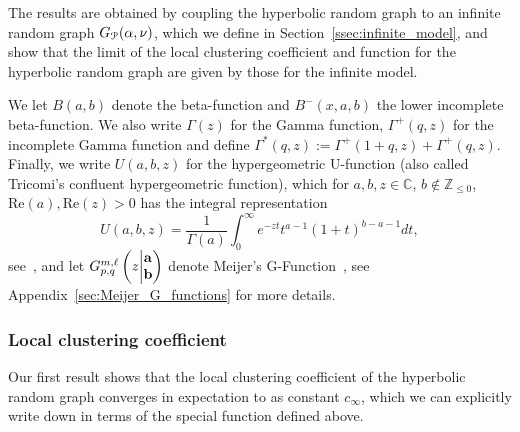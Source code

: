 The results are obtained by coupling the hyperbolic random graph to an infinite random graph $G_\Pcal(\alpha,\nu)$, which we define in Section~\ref{ssec:infinite_model}, and show that the limit of the local clustering coefficient and function for the hyperbolic random graph are given by those for the infinite model. 

We let $B(a,b)$ denote the beta-function and $B^-(x,a,b)$ the lower incomplete beta-function. We also write $\Gamma(z)$ for the Gamma function, $\Gamma^+(q,z)$ for the incomplete Gamma function and define $\Gamma^\ast(q,z) := \Gamma^+(1 + q, z) + \Gamma^+(q, z)$. Finally, we write $U(a,b,z)$ for the hypergeometric U-function (also called Tricomi's confluent hypergeometric function), which for $a,b,z\in \mathbb{C}$, $b \not \in \mathbb{Z}_{\leq 0}$, $\mathrm{Re}(a), \mathrm{Re}(z) >0$ has the integral representation 
\[
	U(a,b,z) = \frac{1}{\Gamma(a)} \int_0^\infty e^{-zt} t^{a-1} (1+t)^{b-a-1} dt,
\] 
see~\cite[p.255 Equation (2)]{erdelyi1953higher}, and let $\MeijerGnew{m}{\ell}{p}{q}{{\bf a}}{{\bf b}}{z}$ denote Meijer's G-Function~\cite{meijer1946gfunction}, see Appendix~\ref{sec:Meijer_G_functions} for more details.

\subsubsection{Local clustering coefficient}

Our first result shows that the local clustering coefficient of the hyperbolic random graph converges in expectation to as constant $c_\infty$, which we can explicitly write down in terms of the special function defined above.

